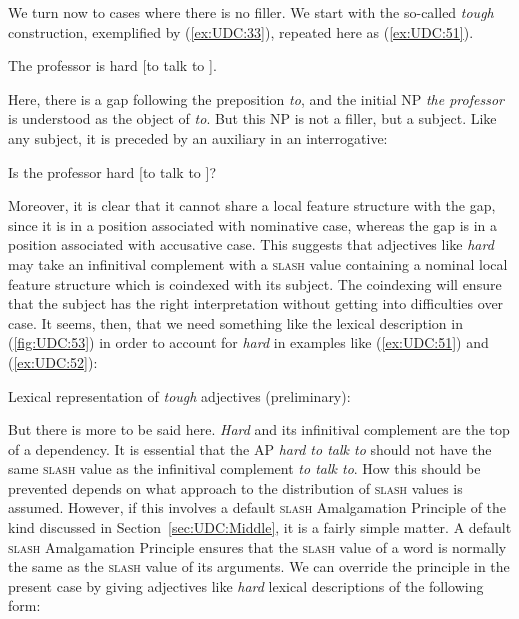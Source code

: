 \documentclass[output=paper
,notxmath 
 	        ,biblatex
                ,babelshorthands
                ,newtxmath
                ,draftmode
                ,colorlinks, citecolor=brown
]{langscibook}
\begin{document}
We\label{udc:page-no-filler-start} turn now to cases where there is no filler. We start with the
so-called \emph{tough} construction, exemplified by (\ref{ex:UDC:33}), repeated here as
(\ref{ex:UDC:51}).

\begin{exe}
\ex \label{ex:UDC:51}
The professor is hard [to talk to \trace{}].
\end{exe}

\noindent
Here, there is a gap following the preposition \emph{to}, and the
initial NP \emph{the professor} is understood as the object of
\emph{to}. But this NP is not a filler, but a subject. Like any subject,
it is preceded by an auxiliary in an interrogative:

\begin{exe}
\ex \label{ex:UDC:52}
 Is the professor hard [to talk to \trace{}]?
\end{exe}
 
\noindent
Moreover, it is clear that it cannot share a local feature structure
with the gap, since it is in a position associated with nominative case,
whereas the gap is in a position associated with accusative case. This
suggests that adjectives like \emph{hard} may take an infinitival
complement with a \textsc{slash} value containing a nominal local feature
structure which is coindexed with its subject. The coindexing will
ensure that the subject has the right interpretation without getting
into difficulties over case. It seems, then, that we need something like
the lexical description in (\ref{fig:UDC:53}) in order to account for \emph{hard} in examples like (\ref{ex:UDC:51})
and (\ref{ex:UDC:52}):
  
\ea
\label{fig:UDC:53}
Lexical representation of \textit{tough} adjectives (preliminary):\\
\z

\noindent
But there is more to be said here. \emph{Hard} and its infinitival
complement are the top of a dependency. It is essential that the AP
\emph{hard to talk to} should not have the same \textsc{slash} value
as the infinitival complement \emph{to talk to}. How this should be
prevented depends on what approach to the distribution of
\textsc{slash} values is assumed.  However, if this involves a default
\textsc{slash} Amalgamation Principle of the kind discussed in
Section~\ref{sec:UDC:Middle}, it is a fairly simple matter. A default
\textsc{slash} Amalgamation Principle ensures that the \textsc{slash}
value of a word is normally the same as the \textsc{slash} value of
its arguments. We can override the principle in the present case by
giving adjectives like \emph{hard} lexical descriptions of the
following form:
\end{document}
